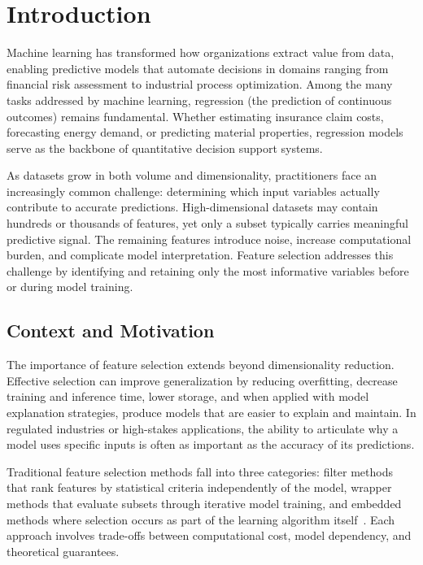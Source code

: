 \chapter{Introduction}

Machine learning has transformed how organizations extract value from data, enabling predictive models that automate decisions in domains ranging from financial risk assessment to industrial process optimization. Among the many tasks addressed by machine learning, regression (the prediction of continuous outcomes) remains fundamental. Whether estimating insurance claim costs, forecasting energy demand, or predicting material properties, regression models serve as the backbone of quantitative decision support systems.

As datasets grow in both volume and dimensionality, practitioners face an increasingly common challenge: determining which input variables actually contribute to accurate predictions. High-dimensional datasets may contain hundreds or thousands of features, yet only a subset typically carries meaningful predictive signal. The remaining features introduce noise, increase computational burden, and complicate model interpretation. Feature selection addresses this challenge by identifying and retaining only the most informative variables before or during model training.

\section{Context and Motivation}

The importance of feature selection extends beyond dimensionality reduction. Effective selection can improve generalization by reducing overfitting, decrease training and inference time, lower storage, and when applied with model explanation strategies, produce models that are easier to explain and maintain. In regulated industries or high-stakes applications, the ability to articulate why a model uses specific inputs is often as important as the accuracy of its predictions.

Traditional feature selection methods fall into three categories: filter methods that rank features by statistical criteria independently of the model, wrapper methods that evaluate subsets through iterative model training, and embedded methods where selection occurs as part of the learning algorithm itself~\cite{guyon2003introduction}. Each approach involves trade-offs between computational cost, model dependency, and theoretical guarantees.

